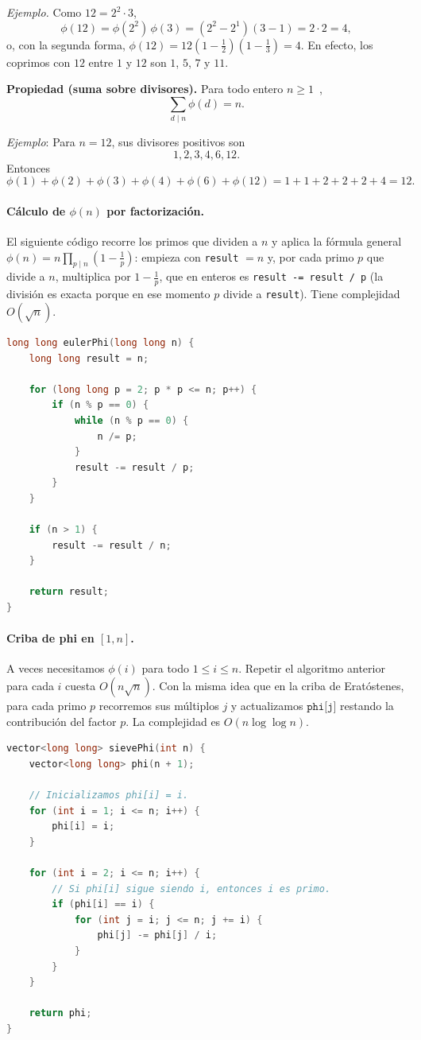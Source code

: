 \textit{Ejemplo.} Como $12 = 2^2\cdot 3$,
\[
\phi(12) = \phi(2^2)\,\phi(3) = (2^2-2^1)(3-1) = 2\cdot 2 = 4,
\]
o, con la segunda forma, $\phi(12)=12\left(1-\frac12\right)\left(1-\frac13\right)=4$. En efecto, los coprimos con $12$ entre $1$ y $12$ son $1$, $5$, $7$ y $11$.

\textbf{Propiedad (suma sobre divisores).} Para todo entero $n\ge 1$~\cite{cpalgos_phi},
\[
\sum_{d \mid n} \phi(d) = n.
\]

\textit{Ejemplo}: Para $n=12$, sus divisores positivos son
\[
1,2,3,4,6,12.
\]
Entonces
\[
\phi(1)+\phi(2)+\phi(3)+\phi(4)+\phi(6)+\phi(12)
=1+1+2+2+2+4=12.
\]

\paragraph{Cálculo de $\phi(n)$ por factorización.} El siguiente código recorre los primos que dividen a $n$ y aplica la fórmula general $\phi(n)=n\prod_{p\mid n}\left(1-\frac{1}{p}\right)$: empieza con \texttt{result} $=n$ y, por cada primo $p$ que divide a $n$, multiplica por $1-\frac1p$, que en enteros es \texttt{result -= result / p} (la división es exacta porque en ese momento $p$ divide a \texttt{result}). Tiene complejidad $O(\sqrt{n})$.
\begin{lstlisting}[language=C++]
long long eulerPhi(long long n) {
    long long result = n;

    for (long long p = 2; p * p <= n; p++) {
        if (n % p == 0) {
            while (n % p == 0) {
                n /= p;
            }
            result -= result / p;
        }
    }

    if (n > 1) {
        result -= result / n;
    }

    return result;
}
\end{lstlisting}

\paragraph{Criba de phi en $[1,n]$.} A veces necesitamos $\phi(i)$ para todo $1\le i\le n$. Repetir el algoritmo anterior para cada $i$ cuesta $O(n\sqrt{n})$. Con la misma idea que en la criba de Eratóstenes, para cada primo $p$ recorremos sus múltiplos $j$ y actualizamos $\texttt{phi[j]}$ restando la contribución del factor $p$. La complejidad es $O(n\log\log n)$.

\begin{lstlisting}[language=C++]
vector<long long> sievePhi(int n) {
    vector<long long> phi(n + 1);

    // Inicializamos phi[i] = i.
    for (int i = 1; i <= n; i++) {
        phi[i] = i;
    }

    for (int i = 2; i <= n; i++) {
        // Si phi[i] sigue siendo i, entonces i es primo.
        if (phi[i] == i) {
            for (int j = i; j <= n; j += i) {
                phi[j] -= phi[j] / i;
            }
        }
    }

    return phi;
}
\end{lstlisting}

